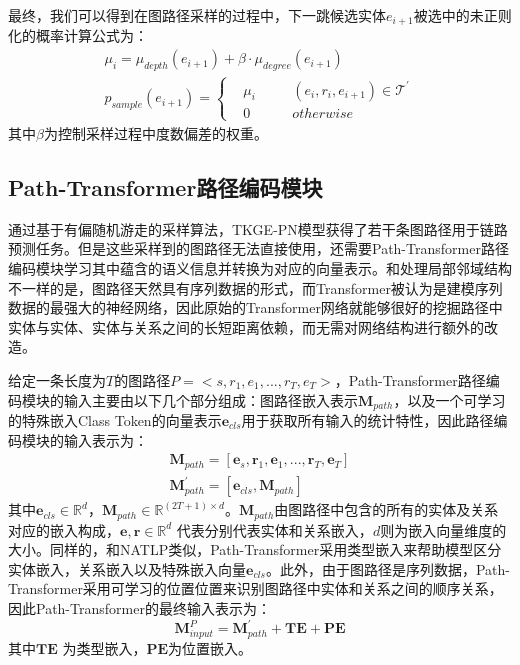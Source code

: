 最终，我们可以得到在图路径采样的过程中，下一跳候选实体$e_{i+1}$被选中的未正则化的概率计算公式为：
\begin{gather}
  \mu_i = \mu_{depth}(e_{i+1})+\beta\cdot\mu_{degree}(e_{i+1})\\
  p_{sample}(e_{i+1})=\left\{
      \begin{aligned}
          &\mu_i &&\quad (e_i,r_i,e_{i+1})\in \mathcal{T}^{\prime} \\
          &0 &&\quad otherwise
      \end{aligned}
  \right.
\end{gather}
其中$\beta$为控制采样过程中度数偏差的权重。

\subsection{Path-Transformer路径编码模块}

通过基于有偏随机游走的采样算法，TKGE-PN模型获得了若干条图路径用于链路预测任务。但是这些采样到的图路径无法直接使用，还需要Path-Transformer路径编码模块学习其中蕴含的语义信息并转换为对应的向量表示。和处理局部邻域结构不一样的是，图路径天然具有序列数据的形式，而Transformer被认为是建模序列数据的最强大的神经网络，因此原始的Transformer网络就能够很好的挖掘路径中实体与实体、实体与关系之间的长短距离依赖，而无需对网络结构进行额外的改造。

给定一条长度为$T$的图路径$P=<s,r_1,e_1,...,r_T,e_T>$，Path-Transformer路径编码模块的输入主要由以下几个部分组成：图路径嵌入表示$\mathbf{M}_{path} $，以及一个可学习的特殊嵌入Class Token的向量表示$\mathbf{e}_{cls}$用于获取所有输入的统计特性，因此路径编码模块的输入表示为：
\begin{gather}
  \mathbf{M}_{path} = [\boldsymbol{e}_s,\boldsymbol{r}_1,\boldsymbol{e}_1,...,\boldsymbol{r}_T,\boldsymbol{e}_T]\\
  \mathbf{M}_{path}^{\prime} = [\boldsymbol{e}_{cls},\mathbf{M}_{path}]
\end{gather}
其中$\boldsymbol{e}_{cls}\in\mathbb{R}^d$，$\mathbf{M}_{path} \in \mathbb{R}^{(2T+1)\times d}$。$\mathbf{M}_{path}$由图路径中包含的所有的实体及关系对应的嵌入构成，$\boldsymbol{e},\boldsymbol{r} \in \mathbb{R}^d$ 代表分别代表实体和关系嵌入，$d$则为嵌入向量维度的大小。同样的，和NATLP类似，Path-Transformer采用类型嵌入来帮助模型区分实体嵌入，关系嵌入以及特殊嵌入向量$\boldsymbol{e}_{cls}$。此外，由于图路径是序列数据，Path-Transformer采用可学习的位置位置来识别图路径中实体和关系之间的顺序关系，因此Path-Transformer的最终输入表示为：
\begin{equation}
  \mathbf{M}_{input}^{P} = \mathbf{M}_{path}^{\prime}+\mathbf{TE} + \mathbf{PE}
\end{equation}
其中$\mathbf{TE}$ 为类型嵌入，$\mathbf{PE}$为位置嵌入。

